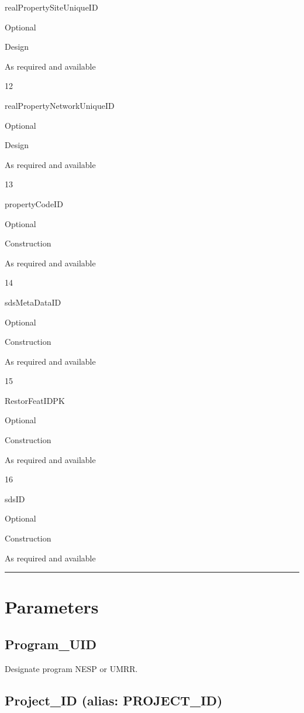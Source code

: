 \documentclass[
  letterpaper,
  DIV=11,
  numbers=noendperiod]{scrreprt}
\begin{document}
realPropertySiteUniqueID

Optional

Design

As required and available

12

realPropertyNetworkUniqueID

Optional

Design

As required and available

13

propertyCodeID

Optional

Construction

As required and available

14

sdsMetaDataID

Optional

Construction

As required and available

15

RestorFeatIDPK

Optional

Construction

As required and available

16

sdsID

Optional

Construction

As required and available

\begin{center}\rule{0.5\linewidth}{0.5pt}\end{center}

\section{Parameters}\label{parameters-22}

\subsection{Program\_UID}\label{program_uid-22}

Designate program NESP or UMRR.

\subsection{Project\_ID (alias:
PROJECT\_ID)}\label{project_id-alias-project_id-22}
\end{document}
